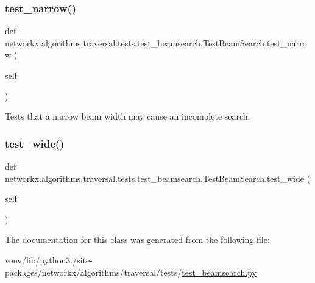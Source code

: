 \subsubsection{\texorpdfstring{test\+\_\+narrow()}{test\_narrow()}}
{\footnotesize\ttfamily def networkx.\+algorithms.\+traversal.\+tests.\+test\+\_\+beamsearch.\+Test\+Beam\+Search.\+test\+\_\+narrow (\begin{DoxyParamCaption}\item[{}]{self }\end{DoxyParamCaption})}

\begin{DoxyVerb}Tests that a narrow beam width may cause an incomplete search.\end{DoxyVerb}
 \mbox{\label{classnetworkx_1_1algorithms_1_1traversal_1_1tests_1_1test__beamsearch_1_1TestBeamSearch_a097676fae73d5c43791dd42318514b61}} 
\subsubsection{\texorpdfstring{test\+\_\+wide()}{test\_wide()}}
{\footnotesize\ttfamily def networkx.\+algorithms.\+traversal.\+tests.\+test\+\_\+beamsearch.\+Test\+Beam\+Search.\+test\+\_\+wide (\begin{DoxyParamCaption}\item[{}]{self }\end{DoxyParamCaption})}



The documentation for this class was generated from the following file\+:\begin{DoxyCompactItemize}
\item 
venv/lib/python3./site-\/packages/networkx/algorithms/traversal/tests/\hyperlink{test__beamsearch_8py}{test\+\_\+beamsearch.\+py}\end{DoxyCompactItemize}
